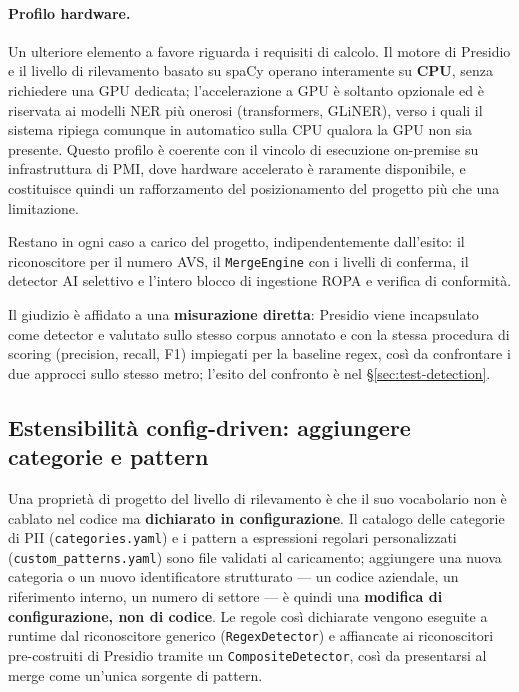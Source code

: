 \paragraph{Profilo hardware.} Un ulteriore elemento a favore riguarda i requisiti di calcolo. Il motore di Presidio e il livello di rilevamento basato su spaCy operano interamente su \textbf{CPU}, senza richiedere una GPU dedicata; l'accelerazione a GPU è soltanto opzionale ed è riservata ai modelli NER più onerosi (transformers, GLiNER), verso i quali il sistema ripiega comunque in automatico sulla CPU qualora la GPU non sia presente. Questo profilo è coerente con il vincolo di esecuzione on-premise su infrastruttura di PMI, dove hardware accelerato è raramente disponibile, e costituisce quindi un rafforzamento del posizionamento del progetto più che una limitazione.

Restano in ogni caso a carico del progetto, indipendentemente dall'esito: il riconoscitore per il numero AVS, il \texttt{MergeEngine} con i livelli di conferma, il detector AI selettivo e l'intero blocco di ingestione ROPA e verifica di conformità.

Il giudizio è affidato a una \textbf{misurazione diretta}: Presidio viene incapsulato come detector e valutato sullo stesso corpus annotato e con la stessa procedura di scoring (precision, recall, F1) impiegati per la baseline regex, così da confrontare i due approcci sullo stesso metro; l'esito del confronto è nel §\ref{sec:test-detection}.

\subsection{Estensibilità config-driven: aggiungere categorie e pattern}
\label{sub:estensibilita-detection}

Una proprietà di progetto del livello di rilevamento è che il suo vocabolario non è cablato nel codice ma \textbf{dichiarato in configurazione}. Il catalogo delle categorie di PII (\texttt{categories.yaml}) e i pattern a espressioni regolari personalizzati (\texttt{custom\_patterns.yaml}) sono file validati al caricamento; aggiungere una nuova categoria o un nuovo identificatore strutturato --- un codice aziendale, un riferimento interno, un numero di settore --- è quindi una \textbf{modifica di configurazione, non di codice}. Le regole così dichiarate vengono eseguite a runtime dal riconoscitore generico (\texttt{RegexDetector}) e affiancate ai riconoscitori pre-costruiti di Presidio tramite un \texttt{CompositeDetector}, così da presentarsi al merge come un'unica sorgente di pattern.

